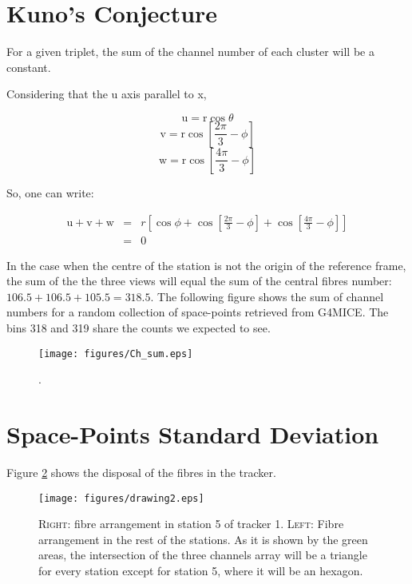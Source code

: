 \appendix
\section{Kuno's Conjecture \label{appendix1}}
For a given triplet, the sum of the channel number of each cluster will be a constant.
 


 Considering that the u axis parallel to x,
 
 \[
 \mbox{u}=\mbox{r}\cos\theta
 \]
 \[
 \mbox{v}=\mbox{r}\cos \left [ \frac{2\pi}{3}-\phi \right ]
 \]
 \[
 \mbox{w}=\mbox{r}\cos \left [\frac{4\pi}{3}-\phi \right ]
 \]
 
 So, one can write:
 
\begin{eqnarray}
\mbox{u}+\mbox{v}+\mbox{w} &=& r \left [ \cos \phi + \cos \left [ \frac{2\pi}{3}-\phi \right ] + \cos \left [\frac{4\pi}{3}-\phi \right ] \right] \\
                &=& 0
\end{eqnarray}

In the case when the centre of the station is not the origin of the reference frame, the sum of the the three views will equal the sum of the central fibres number: $106.5+106.5+105.5 = 318.5$. The following figure shows the sum of channel numbers for a random collection of space-points retrieved from G4MICE. The bins 318 and 319 share the counts we expected to see.
 
 \begin{figure}[h!]
  \begin{center}
      \texttt{[image: figures/Ch\_sum.eps]}
      \end{center}
      \caption{.}
       \label{some}
\end{figure}

\section{Space-Points Standard Deviation \label{appendix2}}
Figure \ref{drawing} shows the disposal of the fibres in the tracker. 
\begin{figure}[h!]
  \begin{center}
      \texttt{[image: figures/drawing2.eps]}
      \end{center}
      \caption{\textsc{Right:} fibre arrangement in station 5 of tracker 1. \textsc{Left:} Fibre arrangement in the rest of the stations. As it is shown by the green areas, the intersection of the three channels array will be a triangle for every station except for station 5, where it will be an hexagon.}
       \label{drawing}
\end{figure}

